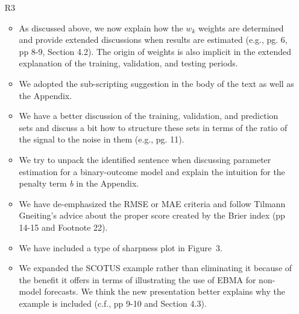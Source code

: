 \documentclass[10pt]{article}
\begin{document}
\begin{itemize}
\item[R3]
\begin{itemize}
\item As discussed above, we now explain how the $w_k$ weights are determined and provide extended discussions when results are estimated (e.g., pg. 6,  pp 8-9, Section 4.2). The origin of weights is also implicit in the extended explanation of the training, validation, and testing periods.
\item We adopted the sub-scripting suggestion in the body of the text as well as the Appendix.
\item We have a better discussion of the training, validation, and prediction sets and discuss a bit how to structure these sets in terms of the ratio of the signal to the noise in them (e.g., pg. 11).
\item We try to unpack the identified sentence when discussing parameter estimation for a binary-outcome model and explain the intuition for the penalty term {\em b} in the Appendix.  
\item We have de-emphasized the RMSE or MAE criteria and follow Tilmann Gneiting's advice about the proper score created by the Brier index (pp 14-15 and Footnote 22).  
\item We have included a type of sharpness plot in Figure~3.
\item We expanded the SCOTUS example rather than eliminating it because of the benefit it offers in terms of illustrating the use of EBMA for non-model forecasts.  We think the new presentation better explains why the example is included  (c.f., pp 9-10 and Section 4.3).
\end{itemize}
\end{itemize}
\end{document}
